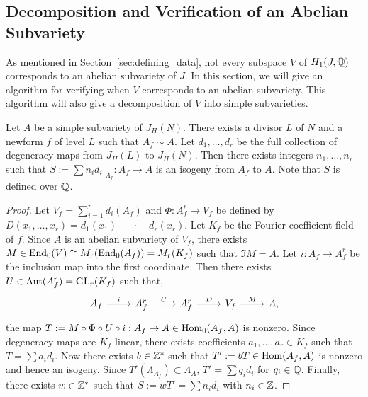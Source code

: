 \documentclass[11pt, proquest]{uwthesis}
\begin{document}
\subsection{Decomposition and Verification of an Abelian Subvariety}
\label{sec:decomp_verify}

As mentioned in Section~\ref{sec:defining_data}, not every subspace $V$ of
$H_1(J, \mathbb{Q})$ corresponds to an abelian subvariety of $J$. In this section, we
will give an algorithm for verifying when $V$ corresponds to an abelian
subvariety. This algorithm will also give a decomposition of $V$ into simple
subvarieties.


\begin{proposition}
    \label{prop:integral_degen}
    Let $A$ be a simple subvariety of $J_H(N)$. There exists a divisor $L$ of
    $N$ and a newform $f$ of level $L$ such that $A_f \sim A$. Let
    $d_1,\ldots,d_r$ be the full collection of degeneracy maps from $J_H(L)$ to
    $J_H(N)$. Then there exists integers $n_1,\ldots,n_r$ such that $S:=\sum
    n_i d_i|_{A_f}: A_f\to A$ is an isogeny from $A_f$ to $A$. Note that $S$ is
    defined over $\mathbb{Q}$.
\end{proposition}
\begin{proof}
    Let $V_f=\sum_{i=1} ^r d_i(A_f)$ and $\Phi:A_f ^r \to V_f$ be defined by
    $D(x_1,\ldots,x_r) = d_1(x_1)+\cdots+d_r(x_r)$. Let $K_f$ be the Fourier
    coefficient field of $f$. Since $A$ is an abelian subvariety of $V_f$, there
    exists $M\in \operatorname{End}_0(V)\cong M_r(\operatorname{End}_0(A_f)) = M_r (K_f)$ such that $\Im M
    = A$. Let $i:A_f\to A_f ^r$ be the inclusion map into the first coordinate.
    Then there exists $U\in \operatorname{Aut}(A_f ^r)=\operatorname{GL}_r (K_f)$ such that,
    \[
        \begin{tikzcd}
            A_f \arrow[r,"i"] &
            A_f ^r \arrow[r, dotted, "U"] &
            A_f ^r \arrow[r, "D"] &
            V_f \arrow[r, "M"] &
            A,
        \end{tikzcd}
    \]
    the map $T:=M \circ \Phi \circ U\circ i:A_f\to A\in \operatorname{Hom}_0(A_f, A)$ is
    nonzero. Since degeneracy maps are $K_f$-linear, there exists coefficients
    $a_1,\ldots,a_r\in K_f$ such that $T = \sum a_i d_i$. Now there exists
    $b\in \mathbb{Z}^*$ such that $T':=bT\in \operatorname{Hom}(A_f, A)$ is nonzero and hence an
    isogeny. Since $T'(\Lambda_{A_f})\subset \Lambda_A$, $T'=\sum q_i d_i$
    for $q_i\in \mathbb{Q}$. Finally, there exists $w\in \mathbb{Z}^*$ such that
    $S:=wT'=\sum n_i d_i$ with $n_i\in \mathbb{Z}$.
\end{proof}
\end{document}
